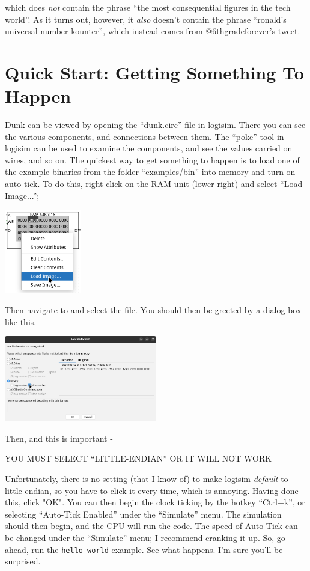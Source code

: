 \documentclass{article}
\begin{document}
which does \textit{not} contain the phrase ``the most consequential figures in the tech world''. As it turns out, however, it \textit{also} doesn't contain the phrase ``ronald's universal number kounter'', which instead comes from @6thgradeforever's tweet.

\section{Quick Start: Getting Something To Happen}

Dunk can be viewed by opening the ``dunk.circ'' file in logisim. There you can see the various components, and connections between them. The ``poke'' tool in logisim can be used to examine the components, and see the values carried on wires, and so on. The quickest way to get something to happen is to load one of the example binaries from the folder ``examples/bin'' into memory and turn on auto-tick. To do this, right-click on the RAM unit (lower right) and select ``Load Image...'';

    \begin{center}\includegraphics[width=0.25\textwidth]{images/load_image.png}\end{center}

Then navigate to and select the file. You should then be greeted by a dialog box like this.

    \begin{center}\includegraphics[width=0.5\textwidth]{images/little_endian.png}\end{center}

Then, and this is important -
    \begin{center}{\color{red} YOU MUST SELECT ``LITTLE-ENDIAN'' OR IT WILL NOT WORK}\end{center}
Unfortunately, there is no setting (that I know of) to make logisim \textit{default} to little endian, so you have to click it every time, which is annoying. Having done this, click "OK". You can then begin the clock ticking by the hotkey ``Ctrl+k'', or selecting ``Auto-Tick Enabled'' under the ``Simulate'' menu. The simulation should then begin, and the CPU will run the code. The speed of Auto-Tick can be changed under the ``Simulate'' menu; I recommend cranking it up. So, go ahead, run the \Verb|hello world| example. See what happens. I'm sure you'll be surprised.
\end{document}
